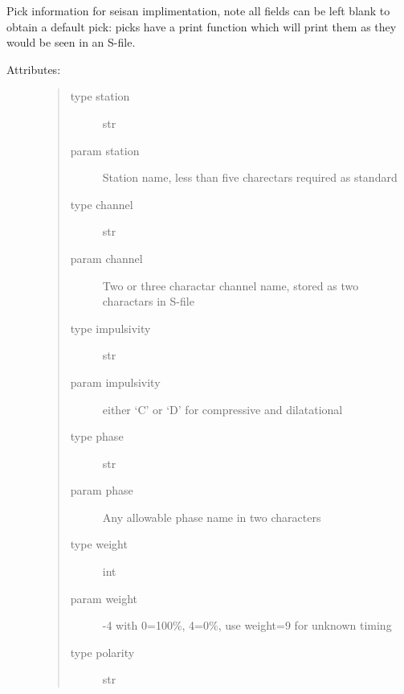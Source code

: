 \documentclass[a4paper,10pt,english]{sphinxmanual}
\begin{document}
\begin{fulllineitems}
\label{submodules/utils.Sfile_util:Sfile_util.PICK}
Pick information for seisan implimentation, note all fields can be left    blank to obtain a default pick: picks have a print function which will    print them as they would be seen in an S-file.
\begin{description}
\item[{Attributes:}] \leavevmode\begin{quote}\begin{description}
\item[{type station}] \leavevmode
str

\item[{param station}] \leavevmode
Station name, less than five charectars required as         standard

\item[{type channel}] \leavevmode
str

\item[{param channel}] \leavevmode
Two or three charactar channel name, stored as two            charactars in S-file

\item[{type impulsivity}] \leavevmode
str

\item[{param impulsivity}] \leavevmode
either `C' or `D' for compressive and dilatational

\item[{type phase}] \leavevmode
str

\item[{param phase}] \leavevmode
Any allowable phase name in two characters

\item[{type weight}] \leavevmode
int

\item[{param weight}] -4 with 0=100\%, 4=0\%, use weight=9 for unknown timing

\item[{type polarity}] \leavevmode
str


\end{description}
\end{quote}
\end{description}
\end{fulllineitems}
\end{document}
